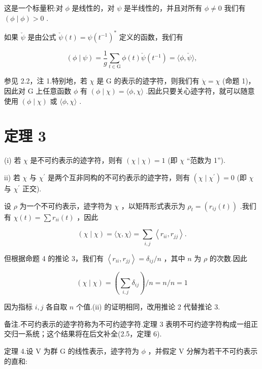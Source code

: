 这是一个标量积:对 \(\phi\) 是线性的，对 \(\psi\) 是半线性的，并且对所有 \(\phi  \neq  0\) 我们有 \(\left( {\phi  \mid  \phi }\right)  > 0\) .

如果 \(\check{\psi }\) 是由公式 \(\check{\psi }\left( t\right)  = \psi {\left( {t}^{-1}\right) }^{ * }\) 定义的函数，我们有

\[
\left( {\phi  \mid  \psi }\right)  = \frac{1}{g}\mathop{\sum }\limits_{{t \in  \mathrm{G}}}\phi \left( t\right) \check{\psi }\left( {t}^{-1}\right)  = \langle \phi ,\check{\psi }\rangle ,
\]

参见 2.2，注 1.特别地，若 \(\chi\) 是 G 的表示的迹字符，则我们有 \(\dot{\chi } = \chi\) (命题 1)，因此对 G 上任意函数 \(\phi\) 有 \(\left( {\phi  \mid  \chi }\right)  = \langle \phi ,\chi \rangle\) .因此只要关心迹字符，就可以随意使用 \(\left( {\phi  \mid  \chi }\right)\) 或 \(\langle \phi ,\chi \rangle\) .

\section*{定理 3}

(i) 若 \(\chi\) 是不可约表示的迹字符，则有 \(\left( {\chi  \mid  \chi }\right)  = 1\) (即 \(\chi\) “范数为 1”).

ii) 若 \(\chi\) 与 \({\chi }^{\prime }\) 是两个互非同构的不可约表示的迹字符，则有 \(\left( {\chi  \mid  {\chi }^{\prime }}\right)  = 0\) (即 \(\chi\) 与 \({\chi }^{\prime }\) 正交).

设 \(\rho\) 为一个不可约表示，迹字符为 \(\chi\) ，以矩阵形式表示为 \({\rho }_{t} = \left( {{r}_{ij}\left( t\right) }\right)\) .我们有 \(\chi \left( t\right)  = \sum {r}_{ii}\left( t\right)\) ，因此

\[
\left( {\chi  \mid  \chi }\right)  = \langle \chi ,\chi \rangle  = \mathop{\sum }\limits_{{i,j}}\left\langle  {{r}_{ii},{r}_{jj}}\right\rangle  .
\]

但根据命题 4 的推论 3，我们有 \(\left\langle  {{r}_{ii},{r}_{jj}}\right\rangle   = {\delta }_{ij}/n\) ，其中 \(n\) 为 \(\rho\) 的次数.因此

\[
\left( {\chi  \mid  \chi }\right)  = \left( {\mathop{\sum }\limits_{{i,j}}{\delta }_{ij}}\right) /n = n/n = 1
\]

因为指标 \(i,j\) 各自取 \(n\) 个值.(ii) 的证明相同，改用推论 2 代替推论 3.

备注.不可约表示的迹字符称为不可约迹字符.定理 3 表明不可约迹字符构成一组正交归一系统；这个结果将在后文补全(2.5，定理 6).

定理 4.设 \(\mathrm{V}\) 为群 \(\mathrm{G}\) 的线性表示，迹字符为 \(\phi\) ，并假定 \(\mathrm{V}\) 分解为若干不可约表示的直和:

